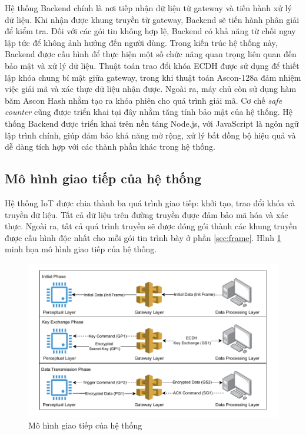 Hệ thống Backend chính là nơi tiếp nhận dữ liệu từ gateway và tiến hành xử lý dữ liệu. Khi nhận được khung truyền từ gateway, Backend sẽ tiến hành phân giải để kiểm tra. Đối với các gói tin không hợp lệ, Backend có khả năng từ chối ngay lập tức để không ảnh hưởng đến người dùng. Trong kiến trúc hệ thống này, Backend được cấu hình để thực hiện một số chức năng quan trọng liên quan đến bảo mật và xử lý dữ liệu. Thuật toán trao đổi khóa ECDH được sử dụng để thiết lập khóa chung bí mật giữa gateway, trong khi thuật toán Ascon-128a đảm nhiệm việc giải mã và xác thực dữ liệu nhận được. Ngoài ra, máy chủ còn sử dụng hàm băm Ascon Hash nhằm tạo ra khóa phiên cho quá trình giải mã. Cơ chế \textit{safe counter} cũng được triển khai tại đây nhằm tăng tính bảo mật của hệ thống. Hệ thống Backend được triển khai trên nền tảng Node.js, với JavaScript là ngôn ngữ lập trình chính, giúp đảm bảo khả năng mở rộng, xử lý bất đồng bộ hiệu quả và dễ dàng tích hợp với các thành phần khác trong hệ thống.


\subsection{Mô hình giao tiếp của hệ thống}
\label{sec:tongquan}
Hệ thống IoT được chia thành ba quá trình giao tiếp: khởi tạo, trao đổi khóa và truyền dữ liệu. Tất cả dữ liệu trên đường truyền được đảm bảo mã hóa và xác thực. Ngoài ra, tất cả quá trình truyền sẽ được đóng gói thành các khung truyền được cấu hình độc nhất cho mỗi gói tin trình bày ở phần \ref{sec:frame}. Hình \ref{fig:system} minh họa mô hình giao tiếp của hệ thống.

\begin{figure}[h]
    \centering
    \includegraphics[width=0.85\linewidth]{images/system.pdf}
    \caption{Mô hình giao tiếp của hệ thống}
    \label{fig:system}
\end{figure}

